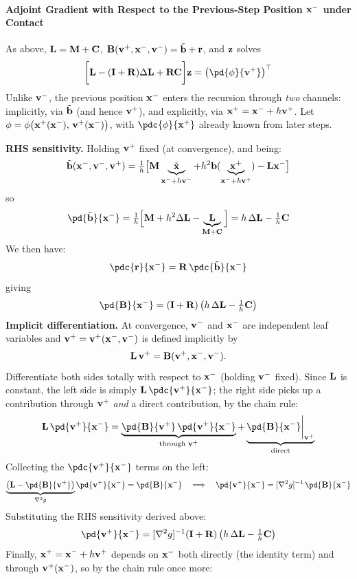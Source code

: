 \begin{derivation}
\paragraph{Adjoint Gradient with Respect to the Previous-Step Position $\mathbf{x}^-$ under Contact} \mbox{}\par\medskip

\begin{reminder}
As above, $\mathbf{L}=\mathbf{M}+\mathbf{C}$, $\mathbf{B}(\mathbf{v}^+,\mathbf{x}^-,\mathbf{v}^-)=\tilde{\mathbf{b}}+\mathbf{r}$, and $\mathbf{z}$ solves
$$
\bigg[\LL-(\I+\R)\Delta\LL+\R\C\bigg]\z = \left(\pd{\phi}{\vv^+}\right)^\top
$$
Unlike $\mathbf{v}^-$, the previous position $\mathbf{x}^-$ enters the recursion through \emph{two} channels: implicitly, via $\tilde{\mathbf{b}}$ (and hence $\mathbf{v}^+$), and explicitly, via $\mathbf{x}^+=\mathbf{x}^-+h\mathbf{v}^+$. Let $\phi=\phi\big(\mathbf{x}^+(\mathbf{x}^-),\,\mathbf{v}^+(\mathbf{x}^-)\big)$, with $\pdc{\phi}{\x^+}$ already known from later steps.
\end{reminder}
\textbf{RHS sensitivity.} Holding $\mathbf{v}^+$ fixed (at convergence), and being: 
\[
\tilde{\mathbf{b}}(\mathbf{x}^-,\mathbf{v}^-,\mathbf{v}^+)=\tfrac1h\big[\mathbf{M}\underbrace{\tilde{\mathbf{x}}}_{\mathbf{x}^-+h\mathbf{v}^-}+h^2\mathbf{b}(\underbrace{\mathbf{x}^+}_{{\mathbf{x}^-+h\mathbf{v}^+}})-\mathbf{L}\mathbf{x}^-\big]
\] 
so
$$
\pd{\tilde\bb}{\x^-} = \tfrac1h\Big[\M+h^2\Delta\LL-\underbrace{\LL}_{\M+\C}\Big] = h\,\Delta\LL - \tfrac1h\C
$$
We then have: 
$$\pdc{\rr}{\x^-}=\R\,\pdc{\tilde\bb}{\x^-}$$
giving
$$
\pd{\B}{\x^-} = (\I+\R)\left(h\,\Delta\LL-\tfrac1h\C\right)
$$
\textbf{Implicit differentiation.} At convergence, $\mathbf{v}^-$ and $\mathbf{x}^-$ are independent leaf
variables and $\mathbf{v}^+=\mathbf{v}^+(\mathbf{x}^-,\mathbf{v}^-)$ is defined implicitly by
$$
\mathbf{L}\,\mathbf{v}^+ = \mathbf{B}(\mathbf{v}^+,\mathbf{x}^-,\mathbf{v}^-).
$$
Differentiate both sides totally with respect to $\mathbf{x}^-$ (holding $\mathbf{v}^-$ fixed). Since $\mathbf{L}$
is constant, the left side is simply $\LL\,\pdc{\vv^+}{\x^-}$; the right side picks up a
contribution through $\mathbf{v}^+$ \emph{and} a direct contribution, by the chain rule:
$$
\LL\,\pd{\vv^+}{\x^-}
=
\underbrace{\pd{\B}{\vv^+}\,\pd{\vv^+}{\x^-}}_{\text{through }\vv^+}
+
\underbrace{\pd{\B}{\x^-}\bigg|_{\vv^+}}_{\text{direct}}
$$
Collecting the $\pdc{\vv^+}{\x^-}$ terms on the left:
$$
\underbrace{\left(\LL - \pd{\B}{\vv^+}\right)}_{\nabla^2 g}\pd{\vv^+}{\x^-}
=
\pd{\B}{\x^-}
\quad\Longrightarrow\quad
\pd{\vv^+}{\x^-} = [\nabla^2 g]^{-1}\,\pd{\B}{\x^-}
$$
Substituting the RHS sensitivity derived above:
$$
\pd{\vv^+}{\x^-} = [\nabla^2 g]^{-1}(\I+\R)\left(h\,\Delta\LL-\tfrac1h\C\right)
$$
Finally, $\mathbf{x}^+=\mathbf{x}^-+h\mathbf{v}^+$ depends on $\mathbf{x}^-$ both directly (the identity term) and through $\mathbf{v}^+(\mathbf{x}^-)$, so by the chain rule once more:

\end{derivation}
